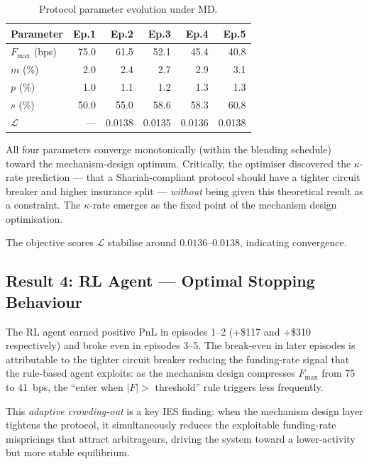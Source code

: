 \documentclass[10pt,twocolumn]{article}
\theoremstyle{plain}
\theoremstyle{definition}
\begin{document}
\begin{table}[h!]
\centering
\caption{Protocol parameter evolution under MD.}
\label{tab:results_params}
\small
\begin{tabular}{lrrrrr}
\toprule
Parameter & Ep.1 & Ep.2 & Ep.3 & Ep.4 & Ep.5 \\
\midrule
$F_{\max}$ (bps)   & 75.0 & 61.5 & 52.1 & 45.4 & 40.8 \\
$m$ (\%)           &  2.0 &  2.4 &  2.7 &  2.9 &  3.1 \\
$p$ (\%)           &  1.0 &  1.1 &  1.2 &  1.3 &  1.3 \\
$s$ (\%)           & 50.0 & 55.0 & 58.6 & 58.3 & 60.8 \\
$\mathcal{L}$      & --- & 0.0138 & 0.0135 & 0.0136 & 0.0138 \\
\bottomrule
\end{tabular}
\end{table}

All four parameters converge monotonically (within
the blending schedule) toward the mechanism-design
optimum.  Critically, the optimiser discovered the
$\kappa$-rate prediction --- that a Shariah-compliant
protocol should have a tighter circuit breaker and higher
insurance split --- \emph{without} being given this
theoretical result as a constraint.  The $\kappa$-rate
emerges as the fixed point of the mechanism design
optimisation.

The objective scores $\mathcal{L}$ stabilise around
$0.0136$--$0.0138$, indicating convergence.

\subsection{Result 4: RL Agent --- Optimal Stopping Behaviour}

The RL agent earned positive PnL in episodes 1--2 (+\$117
and +\$310 respectively) and broke even in episodes 3--5.
The break-even in later episodes is attributable to the
tighter circuit breaker reducing the funding-rate signal
that the rule-based agent exploits: as the mechanism design
compresses $F_{\max}$ from 75 to 41~bps, the
``enter when $|F|>$ threshold'' rule triggers less frequently.

This \emph{adaptive crowding-out} is a key IES finding:
when the mechanism design layer tightens the protocol,
it simultaneously reduces the exploitable funding-rate
mispricings that attract arbitrageurs, driving the system
toward a lower-activity but more stable equilibrium.
\end{document}
